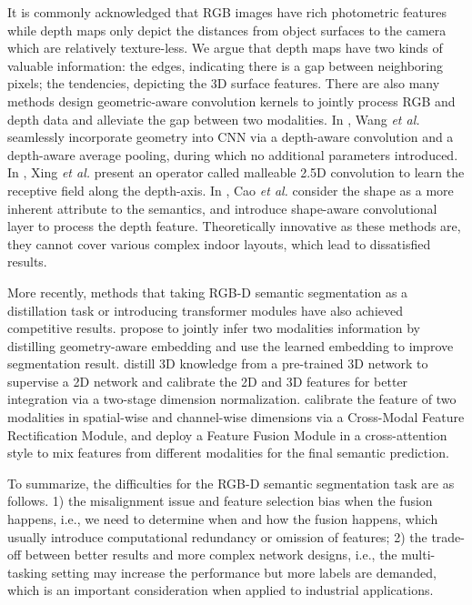 ﻿\documentclass[journal]{IEEEtran}
\begin{document}
    It is commonly acknowledged that RGB images have rich photometric features while depth maps only depict the distances from object surfaces to the camera which are relatively texture-less. We argue that depth maps have two kinds of valuable information: the edges, indicating there is a gap between neighboring pixels; the tendencies, depicting the 3D surface features. There are also many methods design geometric-aware convolution kernels to jointly process RGB and depth data and alleviate the gap between two modalities. In \cite{2018depthaware}, Wang \emph{et al.} seamlessly incorporate geometry into CNN via a depth-aware convolution and a depth-aware average pooling, during which no additional parameters introduced. In \cite{2020malleable}, Xing \emph{et al.} present an operator called malleable 2.5D convolution to learn the receptive field along the depth-axis. In \cite{2021shapeconv}, Cao \emph{et al.} consider the shape as a more inherent attribute to the semantics, and introduce shape-aware convolutional layer to process the depth feature. Theoretically innovative as these methods are, they cannot cover various complex indoor layouts, which lead to dissatisfied results. 

    More recently, methods that taking RGB-D semantic segmentation as a distillation task or introducing transformer modules have also achieved competitive results. \cite{jiao2019geometrydistillation} propose to jointly infer two modalities information by distilling geometry-aware embedding and use the learned embedding to improve segmentation result. \cite{liu2021distillation} distill 3D knowledge from a pre-trained 3D network to supervise a 2D network and calibrate the 2D and 3D features for better integration via a two-stage dimension normalization. \cite{liu2022cmx} calibrate the feature of two modalities in spatial-wise and channel-wise dimensions via a Cross-Modal Feature Rectification Module, and deploy a Feature Fusion Module in a cross-attention style to mix features from different modalities for the final semantic prediction. 
  
    To summarize, the difficulties for the RGB-D semantic segmentation task are as follows. 1) the misalignment issue and feature selection bias when the fusion happens, i.e., we need to determine when and how the fusion happens, which usually introduce computational redundancy or omission of features; 2) the trade-off between better results and more complex network designs, i.e., the multi-tasking setting may increase the performance but more labels are demanded, which is an important consideration when applied to industrial applications. 
\end{document}

